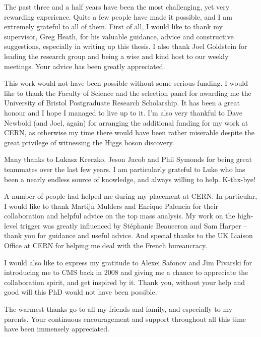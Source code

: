 


\begin{acknowledgements}
The past three and a half years have been the most challenging, yet very rewarding experience. Quite a few people have
made it possible, and I am extremely grateful to all of them. First of all, I would like to thank my supervisor, Greg
Heath, for his valuable guidance, advice and constructive suggestions, especially in writing up this thesis. I also
thank Joel Goldstein for leading the research group and being a wise and kind host to our weekly meetings. Your advice
has been greatly appreciated.

This work would not have been possible without some serious funding. I would like to thank the Faculty of Science and
the selection panel for awarding me the University of Bristol Postgraduate Research Scholarship. It has been a great
honour and I hope I managed to live up to it. I'm also very thankful to Dave Newbold (and Joel, again) for arranging the
additional funding for my work at CERN, as otherwise my time there would have been rather miserable despite the great
privilege of witnessing the Higgs boson discovery.

Many thanks to Lukasz Kreczko, Jeson Jacob and Phil Symonds for being great teammates over the last few years. I am
particularly grateful to Luke who has been a nearly endless source of knowledge, and always willing to help. K-thx-bye!

A number of people had helped me during my placement at CERN. In particular, I would like to thank Martijn Mulders and
Enrique Palencia for their collaboration and helpful advice on the top mass analysis. My work on the high-level trigger
was greatly influenced by St\'{e}phanie Beauceron and Sam Harper -- thank you for guidance and useful advice. And special
thanks to the UK Liaison Office at CERN for helping me deal with the French bureaucracy.

I would also like to express my gratitude to Alexei Safonov and Jim Pivarski for introducing me to CMS back in 2008 and
giving me a chance to appreciate the collaboration spirit, and get inspired by it. Thank you, without your help and good
will this PhD would not have been possible.

The warmest thanks go to all my friends and family, and especially to my parents. Your continuous encouragement and
support throughout all this time have been immensely appreciated. %

\end{acknowledgements}


